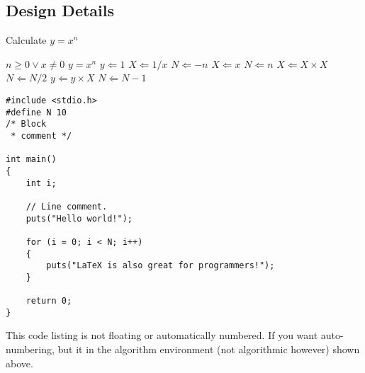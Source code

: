 \subsection{Design Details}


\begin{algorithm} [tbh]                     %
\caption{Calculate $y = x^n$}          %
\label{alg1}                           %
\begin{algorithmic}                    %
    \REQUIRE $n \geq 0 \vee x \neq 0$
    \ENSURE $y = x^n$
    \STATE $y \Leftarrow 1$
        \STATE $X \Leftarrow 1 / x$
        \STATE $N \Leftarrow -n$
    \ELSE
        \STATE $X \Leftarrow x$
        \STATE $N \Leftarrow n$
    \ENDIF
            \STATE $X \Leftarrow X \times X$
            \STATE $N \Leftarrow N / 2$
        \ELSE[$N$ is odd]
            \STATE $y \Leftarrow y \times X$
            \STATE $N \Leftarrow N - 1$
        \ENDIF
    \ENDWHILE
\end{algorithmic}
\end{algorithm} 
 
\begin{lstlisting}
#include <stdio.h>
#define N 10
/* Block
 * comment */
 
int main()
{
    int i;
 
    // Line comment.
    puts("Hello world!");
 
    for (i = 0; i < N; i++)
    {
        puts("LaTeX is also great for programmers!");
    }
 
    return 0;
}
\end{lstlisting}
This code listing is not floating or automatically numbered.  If you want auto-numbering, but it in the algorithm environment (not algorithmic however) shown above.

